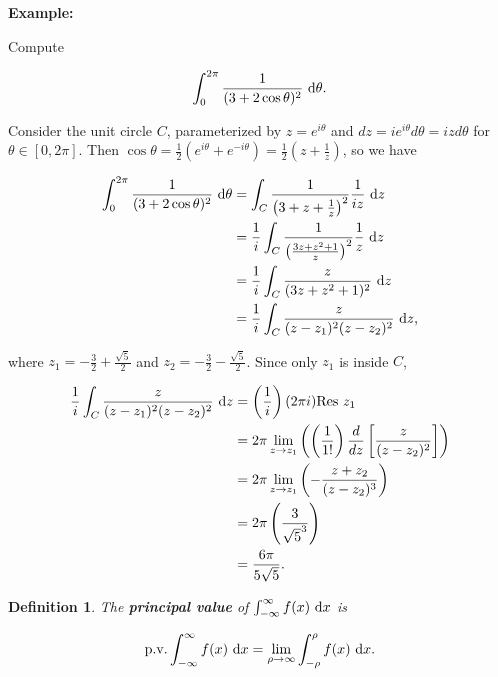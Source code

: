 \documentclass{article}
\theoremstyle{colontheorem}
\newtheorem{definition}[theorem]{Definition}
\newcommand{\Res}{\textnormal{Res}}
\newcommand{\pv}{\textnormal{p.v.}}
\newenvironment{Def}
{
	\begin{mdframed}[backgroundcolor=DefGreen!10]
	\begin{definition}
}
{
	\end{definition}
	\end{mdframed}
	
	\vspace{.15in}
}
\newenvironment{Example}
{
	\begin{mdframed}
	\textbf{Example:}%
}
{
	\end{mdframed}
	
	\vspace{.15in}
}
\begin{document}
\begin{Example}
	Compute
	
	$$
		\int_0^{2 \pi} \frac{1}{(3 + 2 \cos \theta)^2}\ \textnormal{d}\theta.
	$$
	
	Consider the unit circle $C$, parameterized by $z = e^{i\theta}$ and $dz = i e^{i \theta}d\theta = izd\theta$ for $\theta \in [0, 2\pi]$. Then $\cos \theta = \frac{1}{2} (e^{i \theta} + e^{-i \theta}) = \frac{1}{2} \left( z + \frac{1}{z} \right)$, so we have
	
	\begin{align*}
		\int_0^{2 \pi} \frac{1}{(3 + 2 \cos \theta)^2}\ \textnormal{d}\theta &= \int_C \frac{1}{ \left(3 + z + \frac{1}{z} \right)^2} \frac{1}{iz}\ \textnormal{d}z\\
		&= \frac{1}{i} \int_C \frac{1}{ \left( \frac{3z + z^2 + 1}{z} \right)^2} \frac{1}{z}\ \textnormal{d}z\\
		&= \frac{1}{i} \int_C \frac{z}{ (3z + z^2 + 1)^2}\ \textnormal{d}z\\
		&= \frac{1}{i} \int_C \frac{z}{ (z - z_1)^2 (z - z_2)^2}\ \textnormal{d}z \textnormal{,}
	\end{align*}
	
	where $z_1 = -\frac{3}{2} + \frac{\sqrt{5}}{2}$ and $z_2 = -\frac{3}{2} - \frac{\sqrt{5}}{2}$. Since only $z_1$ is inside $C$,
	
	\begin{align*}
		\frac{1}{i} \int_C \frac{z}{ (z - z_1)^2 (z - z_2)^2}\ \textnormal{d}z &= \left( \frac{1}{i} \right) (2 \pi i) \Res\ z_1\\
		&= 2\pi \lim\limits_{z \to z_1} \left( \left( \frac{1}{1!} \right) \frac{d}{dz} \left[ \frac{z}{(z - z_2)^2} \right] \right)\\
		&= 2\pi \lim\limits_{z \to z_1} \left( - \frac{z + z_2}{(z - z_2)^3} \right)\\
		&= 2\pi \left( \frac{3}{\sqrt{5}^3} \right)\\
		&= \frac{6\pi}{5 \sqrt{5}}.
	\end{align*}
	
\end{Example}



\begin{Def}
	
	The \textbf{principal value} of $\int_{-\infty}^{\infty} f(x)\ \textnormal{d}x$ is
	
	$$
		\pv \int_{-\infty}^{\infty} f(x)\ \textnormal{d}x = \lim\limits_{\rho \to \infty} \int_{-\rho}^{\rho} f(x)\ \textnormal{d}x.
	$$
	
\end{Def}
\end{document}
